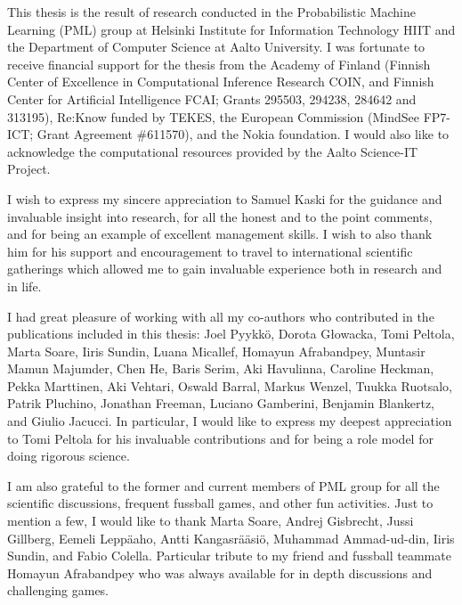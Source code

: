 \documentclass[dissertation,math,vertlayout,pdfa,colorlinks]{aaltoseries}
\begin{document}
\begin{preface}[Espoo]



This thesis is the result of research conducted in the Probabilistic Machine Learning (PML) group at Helsinki Institute for Information Technology HIIT and the Department of Computer Science at Aalto University. I was fortunate to receive financial support for the thesis from the Academy of Finland (Finnish Center of Excellence in Computational Inference Research COIN, and Finnish Center for Artificial Intelligence FCAI; Grants 295503, 294238, 284642 and 313195), Re:Know funded by TEKES, the European Commission (MindSee FP7-ICT; Grant Agreement \#611570), and the Nokia foundation. I would also like to acknowledge the computational resources provided by the Aalto Science-IT Project.

I wish to express my sincere appreciation to Samuel Kaski for the guidance and invaluable insight into research, for all the honest %
and to the point comments, and for being an example of excellent management skills. I wish to also thank him for his support and encouragement to travel to international scientific gatherings which allowed me to gain invaluable experience both in research and in life.

I had great pleasure of working with all my co-authors who contributed in the publications included in this thesis: Joel Pyykk\"o, Dorota G\l{}owacka, Tomi Peltola, Marta Soare, Iiris Sundin, Luana Micallef, Homayun Afrabandpey, Muntasir Mamun Majumder, Chen He, Baris Serim, Aki Havulinna, Caroline Heckman, Pekka Marttinen, Aki Vehtari, Oswald Barral, Markus Wenzel, Tuukka Ruotsalo, Patrik Pluchino, Jonathan Freeman, Luciano Gamberini, Benjamin Blankertz, and Giulio Jacucci. %
In particular, I would like to express my deepest appreciation to Tomi Peltola for his invaluable contributions and for being a role model for doing rigorous science. %

I am also grateful to the former and current members of PML group for all the scientific discussions, frequent fussball games, and other fun activities. Just to mention a few, I would like to thank Marta Soare, Andrej Gisbrecht, Jussi Gillberg, Eemeli Leppäaho, Antti Kangasrääsiö, Muhammad Ammad-ud-din, Iiris Sundin, and Fabio Colella. Particular tribute to my friend and fussball teammate Homayun Afrabandpey who was always available for in depth discussions and challenging games. 


\end{preface}
\end{document}
